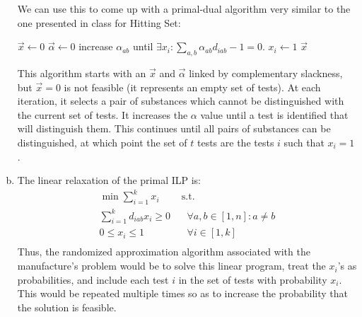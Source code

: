 \documentclass[fleqn]{homework}
\begin{document}
\begin{problem}{1}
\begin{enumerate}[a.]
      We can use this to come up with a primal-dual algorithm very similar to
      the one presented in class for Hitting Set:

      \begin{algorithmic}
          \State $\vec{x} \gets 0$
          \State $\vec{\alpha} \gets 0$
            \State increase $\alpha_{ab}$ until $\exists x_i: \sum_{a,b} \alpha_{ab} d_{iab} - 1 = 0$.
            \State $x_i \gets 1$
          \EndWhile
          \State \Return $\vec{x}$
        \EndFunction
      \end{algorithmic}
      This algorithm starts with an $\vec{x}$ and $\vec{\alpha}$ linked by
      complementary slackness, but $\vec{x} = 0$ is not feasible (it represents
      an empty set of tests).  At each iteration, it selects a pair of
      substances which cannot be distinguished with the current set of tests.
      It increases the $\alpha$ value until a test is identified that will
      distinguish them.  This continues until all pairs of substances can be
      distinguished, at which point the set of $t$ tests are the tests $i$ such
      that $x_i=1$.
    \item The linear relaxation of the primal ILP is:
      \begin{align*}
        \min \sum_{i=1}^k x_i &\text{ s.t.} \\
        \sum_{i=1}^k d_{iab} x_i \ge 0 &\:\:\:\: \forall a,b \in [1,n]: a \ne b \\
        0 \le x_i \le 1 &\:\:\:\: \forall i \in [1, k] \\
      \end{align*}
      Thus, the randomized approximation algorithm associated with the
      manufacture's problem would be to solve this linear program, treat the
      $x_i$'s as probabilities, and include each test $i$ in the set of tests
      with probability $x_i$.  This would be repeated multiple times so as to
      increase the probability that the solution is feasible.
    \end{enumerate}

  \end{problem}
\end{document}
